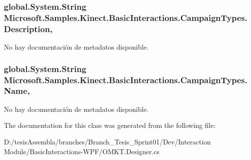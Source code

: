 \hypertarget{class_microsoft_1_1_samples_1_1_kinect_1_1_basic_interactions_1_1_campaign_types_a7882fd65d9fc3055d589656231d1538e}{
\subsubsection[{Description}]{\setlength{\rightskip}{0pt plus 5cm}global.\-System.\-String Microsoft.\-Samples.\-Kinect.\-Basic\-Interactions.\-Campaign\-Types.\-Description\hspace{0.3cm}{\ttfamily [get]}, {\ttfamily [set]}}}\label{class_microsoft_1_1_samples_1_1_kinect_1_1_basic_interactions_1_1_campaign_types_a7882fd65d9fc3055d589656231d1538e}


No hay documentación de metadatos disponible. 

\hypertarget{class_microsoft_1_1_samples_1_1_kinect_1_1_basic_interactions_1_1_campaign_types_a0e4a4fa9c609db2ed87a29183f07009b}{
\subsubsection[{Name}]{\setlength{\rightskip}{0pt plus 5cm}global.\-System.\-String Microsoft.\-Samples.\-Kinect.\-Basic\-Interactions.\-Campaign\-Types.\-Name\hspace{0.3cm}{\ttfamily [get]}, {\ttfamily [set]}}}\label{class_microsoft_1_1_samples_1_1_kinect_1_1_basic_interactions_1_1_campaign_types_a0e4a4fa9c609db2ed87a29183f07009b}


No hay documentación de metadatos disponible. 



The documentation for this class was generated from the following file\-:\begin{DoxyCompactItemize}
\item 
D\-:/tesis\-Assembla/branches/\-Branch\-\_\-\-Tesis\-\_\-\-Sprint01/\-Dev/\-Interaction Module/\-Basic\-Interactions-\/\-W\-P\-F/O\-M\-K\-T.\-Designer.\-cs\end{DoxyCompactItemize}
